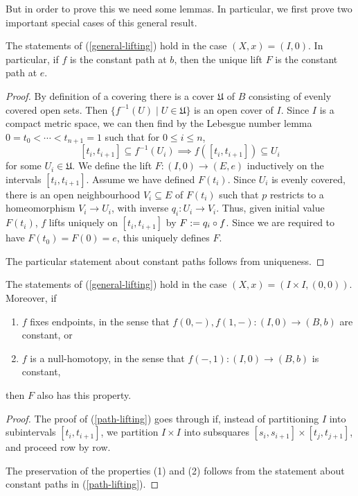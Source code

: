 But in order to prove this we need some lemmas. In particular, we
first prove two important special cases of this general result.

\begin{lemma}
  \label{path-lifting}
  The statements of (\ref{general-lifting}) hold in the case $(X,x) =
  (I,0)$. In particular, if $f$ is the constant path at $b$, then the
  unique lift $F$ is the constant path at $e$.
\end{lemma}

\renewcommand{\U}{\mathfrak{U}}

\begin{proof}
  By definition of a covering there is a cover $\U$ of $B$ consisting
  of evenly covered open sets. Then $\{f^{-1}(U) \mid U \in \U\}$ is
  an open cover of $I$. Since $I$ is a compact metric space, we can
  then find by the Lebesgue number lemma $0 = t_0 < \cdots < t_{n+1} =
  1$ such that for $0 \le i \le n$,
  \[
  [t_i,t_{i+1}] \subseteq f^{-1}(U_i) \implies f([t_i,t_{i+1}])
  \subseteq U_i
  \]
  for some $U_i \in \U$. We define the lift $F : (I,0) \to (E,e)$
  inductively on the intervals $[t_i,t_{i+1}]$. Assume we have defined
  $F(t_i)$. Since $U_i$ is evenly covered, there is an open
  neighbourhood $V_i \subseteq E$ of $F(t_i)$ such that $p$ restricts
  to a homeomorphism $V_i \to U_i$, with inverse $q_i : U_i \to
  V_i$. Thus, given initial value $F(t_i)$, $f$ lifts uniquely on
  $[t_i,t_{i+1}]$ by $F \mathrel{:=} q_i \circ f$. Since we are required
  to have $F(t_0) = F(0) = e$, this uniquely defines $F$.

  The particular statement about constant paths follows from
  uniqueness.
\end{proof}

\begin{lemma}
  \label{homotopy-lifting}
  The statements of (\ref{general-lifting}) hold in the case $(X,x) =
  (I \times I, (0,0))$. Moreover, if
  \begin{enumerate}
  \item $f$ fixes endpoints, in the sense that $f(0,-), f(1,-) : (I,0)
    \to (B,b)$ are constant, or
  \item $f$ is a null-homotopy, in the sense that $f(-,1) : (I,0) \to
    (B,b)$ is constant,
  \end{enumerate}
  then $F$ also has this property.
\end{lemma}

\begin{proof}
  The proof of (\ref{path-lifting}) goes through if, instead of
  partitioning $I$ into subintervals $[t_i,t_{i+1}]$, we partition $I
  \times I$ into subsquares $[s_i,s_{i+1}] \times [t_j,t_{j+1}]$, and
  proceed row by row.

  The preservation of the properties (1) and (2) follows from the
  statement about constant paths in (\ref{path-lifting}).
\end{proof}

